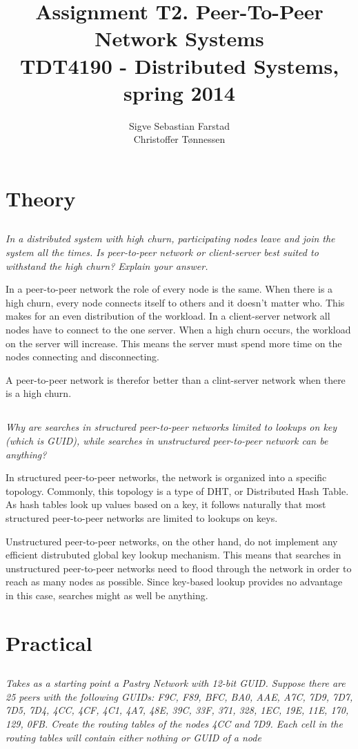 \documentclass{article}
\title{Assignment T2. Peer-To-Peer Network Systems \\
\large TDT4190 - Distributed Systems, spring 2014}
\author{
    Sigve Sebastian Farstad \\
    Christoffer Tønnessen
}
\newcommand{\question}[1]{\subsection{}\textit{#1}\bigskip}
\begin{document}
\maketitle

\section{Theory}

\question{In a distributed system with high churn, participating nodes leave and join the system all the times. Is peer-to-peer network or client-server best suited to withstand the high churn? Explain your answer.}

In a peer-to-peer network the role of every node is the same.
When there is a high churn, every node connects itself to others and it doesn't matter who.
This makes for an even distribution of the workload.
In a client-server network all nodes have to connect to the one server.
When a high churn occurs, the workload on the server will increase.
This means the server must spend more time on the nodes connecting and disconnecting.

A peer-to-peer network is therefor better than a clint-server network when there is a high churn.

\question{Why are searches in structured peer-to-peer networks limited to lookups on key (which is GUID), while searches in unstructured peer-to-peer network can be anything?}

In structured peer-to-peer networks, the network is organized into a specific topology.
Commonly, this topology is a type of DHT, or Distributed Hash Table.
As hash tables look up values based on a key, it follows naturally that most structured peer-to-peer networks are limited to lookups on keys.

Unstructured peer-to-peer networks, on the other hand, do not implement any efficient distrubuted global key lookup mechanism.
This means that searches in unstructured peer-to-peer networks need to flood through the network in order to reach as many nodes as possible.
Since key-based lookup provides no advantage in this case, searches might as well be anything.

\section{Practical}

\question{Takes as a starting point a Pastry Network with 12-bit GUID. Suppose there are 25 peers with the following GUIDs: F9C, F89, BFC, BA0, AAE, A7C, 7D9, 7D7, 7D5, 7D4, 4CC, 4CF, 4C1, 4A7, 48E, 39C, 33F, 371, 328, 1EC, 19E, 11E, 170, 129, 0FB. Create the routing tables of the nodes 4CC and 7D9. Each cell in the routing tables will contain either nothing or GUID of a node}
\end{document}
